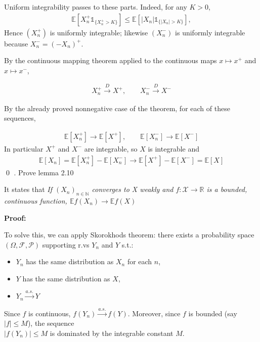 \documentclass[10pt]{article}
\begin{document}
Uniform integrability passes to these parts. Indeed, for any $K > 0$,
\begin{gather*}
    \mathbb{E}[X_n^+\mathbb{1}_{\{X_n^+ > K\}}] \le \mathbb{E}[|X_n|\mathbb{1}_{\{|X_n| > K\}}],
\end{gather*}
Hence $(X_n^+)$ is uniformly integrable; likewise $(X_n^-)$ is uniformly integrable because $X_n^- = (-X_n)^+$.

By the continuous mapping theorem applied to the continuous maps $x \mapsto x^+$ and $x \mapsto x^-$,

\begin{gather*}
    X_n^+ \xrightarrow{D}X^+, \qquad X_n^- \xrightarrow{D}X^-
\end{gather*}

By the already proved nonnegative case of the theorem, for each of these sequences, 

\begin{gather*}
    \mathbb{E}[X_n^+] \to \mathbb{E}[X^+], \qquad \mathbb{E}[X_n^-] \to \mathbb{E}[X^-]
\end{gather*}
In particular $X^+$ and $X^-$ are integrable, so $X$ is integrable and 
\begin{gather*}
    \mathbb{E}[X_n] = \mathbb{E}[X_n^+] - \mathbb{E}[X_n^-] \longrightarrow \mathbb{E}[X^+] - \mathbb{E}[X^-] = \mathbb{E}[X]
\end{gather*}
\qed 
{}. Prove lemma 2.10

It states that \textit{If $(X_n)_{n \in \mathbb{N}}$ converges to X weakly and $f : \mathcal{X} \to \mathbb{R}$ is a bounded, continuous function, $\mathbb{E}f(X_n) \to \mathbb{E}f(X)$}

\textbf{Proof:}

To solve this, we can apply Skorokhods theorem: there exists a probability space $(\Omega, \mathcal{F}, \mathcal{P})$ supporting r.vs $Y_n$ and $Y$ s.t.:
\begin{itemize}
    \item $Y_n$ has the same distribution as $X_n$ for each $n$,
    \item $Y$ has the same distribution as $X$,
    \item $Y_n \xrightarrow{a.s.} Y$
\end{itemize}

Since $f$ is continuous, $f(Y_n) \xrightarrow{a.s.} f(Y)$. Moreover, since $f$ is bounded (say $|f| \le M$), the sequence\\ $|f(Y_n)| \le M$ is dominated by the integrable constant $M$.
\end{document}
